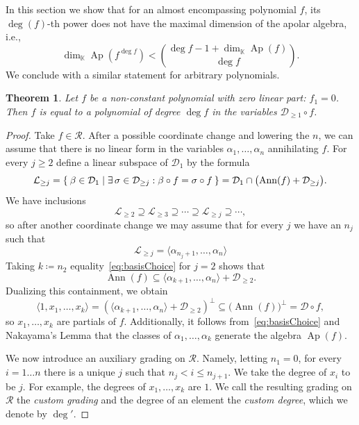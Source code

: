 \documentclass[a4paper,11pt,reqno]{amsart}
\newcommand{\calD}{\mathcal{D}}
\newcommand{\calR}{\mathcal{R}}
\newcommand{\bbK}{\mathbb{K}}
\DeclareMathOperator{\Ann}{Ann}
\DeclareMathOperator{\Ap}{Ap}
\newcommand{\oldtext}[1]{\textcolor{darkelectricblue}{#1}}
\numberwithin{equation}{section}
\theoremstyle{definition}
\theoremstyle{plain}
\newtheorem{teo}[defn]{Theorem}
\theoremstyle{remark}
\begin{document}
In this section we show that for an almost encompassing polynomial $f$, {its $\deg(f)$-th power does not have the maximal dimension of the apolar algebra}, i.e.,
\[
\dim_{\bbK} \Ap(f^{\deg f})<\binom{\deg f-1+\dim_{\bbK}\Ap(f)}{\deg f}.
\]
We conclude with a similar statement for arbitrary polynomials.
\begin{teo}\label{ref:almostCompassing:teo}
    Let $f$ be a non-constant polynomial with zero linear part: $f_1 = 0$. Then $f$ is equal to a
    polynomial of degree $\deg f$ in the variables $\calD_{\geq 1}\circ f$.
\end{teo}
\begin{proof}
    \def\lin{\mathcal{L}}%
    Take $f\in\calR$. After a possible coordinate change and
    lowering the $n$, we can assume that there is no linear form in the variables $\alpha_1, \ldots
    ,\alpha_n$ annihilating $f$.
    For every $j\geq 2$ define a linear subspace of $\calD_{1}$ by the formula
    \[
        \lin_{\geq j} = \Set{ \beta\in \calD_{1} |  \exists\, \sigma\in
        \calD_{\geq j} : \beta\circ f = \sigma \circ
    f} = \calD_{1}\cap \bigl(\Ann(f) + \calD_{\geq j}\bigr).
    \]
    We have inclusions
    \[ \lin_{\geq 2}\supseteq \lin_{\geq 3} \supseteq
    {\cdots} \supseteq \lin_{\geq j} \supseteq
    {\cdots}, \] so after another coordinate change we may assume
    that for every $j$ we have an $n_j$ such that
    \begin{equation}\label{eq:basisChoice}
        \lin_{\geq j} = \langle \alpha_{n_j+1}, \ldots
        ,\alpha_n\rangle
    \end{equation}
    Taking $k \coloneqq n_2$ equality~\eqref{eq:basisChoice} for $j = 2$ shows that
    \[
        \Ann(f) \subseteq \langle \alpha_{k+1}, \ldots
        ,\alpha_n\rangle + \calD_{\geq 2}.\]
        Dualizing this containment, we
        obtain
        \[
            \langle 1, x_1, \ldots ,x_k\rangle = \left(\langle \alpha_{k+1}, \ldots
            ,\alpha_n\rangle + \calD_{\geq 2}\right)^{\perp} \subseteq \bigl(
            \Ann(f) \bigr)^{\perp} = \calD\circ f,
        \]
        so $x_1, \ldots ,x_k$ are partials of $f$. Additionally, it follows
        from~\eqref{eq:basisChoice} and Nakayama's
        Lemma that the classes of $\alpha_1, \ldots ,\alpha_k$ generate the
        algebra $\Ap(f)$.

        We now introduce an auxiliary grading on $\calR$.
        Namely, {letting} $n_1 = 0$, for every $i = 1 \ldots n$ there is a unique
        $j$ such that $n_j < i \leq n_{j+1}$. We take the degree of $x_i$ to be $j$. For example, the degrees of $x_1, \ldots ,x_k$ are $1$.
        {We call the resulting grading on $\calR$ the \emph{custom grading} and the degree of an element the \emph{custom degree}}, which we denote by $\deg'$.


\end{proof}
\end{document}
